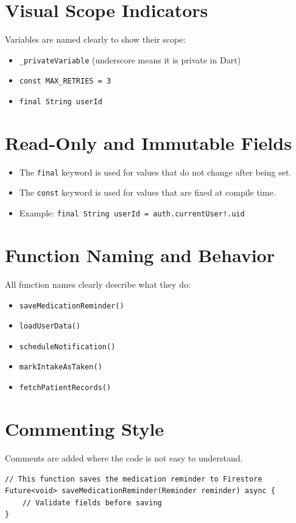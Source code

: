 \documentclass[12pt, a4paper, oneside]{report}
\begin{document}
\section{Visual Scope Indicators}
Variables are named clearly to show their scope:
\begin{itemize}
    \item \texttt{\_privateVariable} (underscore means it is private in Dart)
    \item \texttt{const MAX\_RETRIES = 3}
    \item \texttt{final String userId}
\end{itemize}

\section{Read-Only and Immutable Fields}
\begin{itemize}
    \item The \texttt{final} keyword is used for values that do not change after being set.
    \item The \texttt{const} keyword is used for values that are fixed at compile time.
    \item Example: \texttt{final String userId = auth.currentUser!.uid}
\end{itemize}

\section{Function Naming and Behavior}
All function names clearly describe what they do:
\begin{itemize}
    \item \texttt{saveMedicationReminder()}
    \item \texttt{loadUserData()}
    \item \texttt{scheduleNotification()}
    \item \texttt{markIntakeAsTaken()}
    \item \texttt{fetchPatientRecords()}
\end{itemize}

\section{Commenting Style}
Comments are added where the code is not easy to understand.
\begin{lstlisting}
// This function saves the medication reminder to Firestore
Future<void> saveMedicationReminder(Reminder reminder) async {
    // Validate fields before saving
}
\end{lstlisting}
\end{document}
